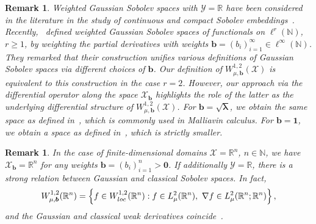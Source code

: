 \documentclass[namedate,webpdf]{ima-authoring-template-blank}
\newcounter{counter}
\numberwithin{counter}{section}
\numberwithin{equation}{section}
\theoremstyle{plain}
\newtheorem{remark}[counter]{Remark}
\theoremstyle{definition}
\newcommand*{\cX}{\mathcal{X}}
\newcommand*{\cY}{\mathcal{Y}}
\newcommand*{\bbN}{\mathbb{N}}
\newcommand*{\bbR}{\mathbb{R}}
\theoremstyle{thmstyletwo}
\begin{document}
\begin{remark}
\label{rmk: weighted Sobolev spaces}
    Weighted Gaussian Sobolev spaces with \( \cY = \bbR \) have been considered in the literature in the study of continuous and compact Sobolev embeddings~\citep{shigekawa_SobolevSpacesWienerSpace_1992, daprato_RegularDensitiesInvariantMeasures_1995, chojnowska-michalik_GeneralizedOrnsteinUhlenbeckSemigroups_2001}.
    Recently,~\cite{luo_SobolevEmbeddingsInfiniteDimensions_2023} defined weighted Gaussian Sobolev spaces of functionals on \(\ell^r(\bbN)\), \(r\geq 1\), by weighting the partial derivatives with weights \( \bm{b} = (b_i)_{i = 1}^{\infty} \in \ell^{\infty}(\bbN) \). They remarked that their construction unifies various definitions of Gaussian Sobolev spaces via different choices of \(\bm{b}\). Our definition of \(W_{\mu, \bm{b}}^{1,2}(\cX)\) is equivalent to this construction in the case \(r = 2\). However, our approach via the differential operator along the space \(\cX_{\bm{b}}\) highlights the role of the latter as the underlying differential structure of \(W_{\mu, \bm{b}}^{1,2}(\cX)\).
    For \(\bm{b} = \sqrt{\bm{\lambda}}\), we obtain the same space as defined in~\citet{bogachev_GaussianMeasures_1998, lunardi_InfiniteDimensionalAnalysis_2015, daprato_IntroductionStochasticAnalysisMalliavin_2014}, which is commonly used in Malliavin calculus. For \(\bm{b} = \bm{1}\), we obtain a space as defined in~\citet{daprato_IntroductionInfiniteDimensionalAnalysis_2006}, which is strictly smaller. 
\end{remark}

\begin{remark}
    In the case of finite-dimensional domains \( \cX = \bbR^n \), \( n \in \bbN \), we have \( \cX_{\bm{b}} = \bbR^n \) for any weights \( \bm{b} = (b_i)_{i=1}^n >\bm{0} \). If additionally \( \cY = \bbR \), there is a strong relation between Gaussian and classical Sobolev spaces. In fact, 
    \[
    W_{\mu, \bm{b}}^{1,2}(\bbR^n)
    = \left\{ f \in W_{\textup{loc}}^{1,2}(\bbR^n) : f \in L^2_{\mu}(\bbR^n), \ \nabla f \in L^2_{\mu}(\bbR^n; \bbR^n) \right\},
    \]
    and the Gaussian and classical weak derivatives coincide~\citep[Prop. 1.5.2]{bogachev_GaussianMeasures_1998}. 
\end{remark}
\end{document}
